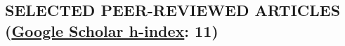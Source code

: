 \documentclass[11pt,letterpaper,resume,roman]{moderncv}
\makeatletter
\let\saved@bibitem\@bibitem
\makeatother
\begin{document}
%

 \begingroup
    \makeatletter
    \let\@bibitem\saved@bibitem
  \endgroup

\subsection{SELECTED PEER-REVIEWED ARTICLES
  (\href{http://scholar.google.com/citations?user=EbtfZcwAAAAJ}{Google Scholar h-index}: 11)}

\renewcommand{\doi}[1]{{doi:~\href{http://dx.doi.org/#1}{#1}}}
\renewcommand{\url}[1]{\href{#1}{#1}}
\newcommand{\rbibentry}[1]{\label{#1}\bibentry{#1}} %
\end{document}
